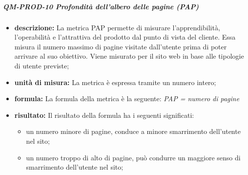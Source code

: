 			\subparagraph{QM-PROD-10 Profondità dell'albero delle pagine (PAP)}
			\begin{itemize}
      			\item \textbf{descrizione: }
					La metrica PAP permette di misurare l'apprendibilità, l'operabilità e l'attrattiva del prodotto dal punto di vista del cliente. Essa misura il numero massimo di pagine visitate dall'utente prima di poter arrivare al suo obiettivo.
					Viene misurato per il sito web in base alle tipologie di utente previste;
				\item \textbf{unità di misura: }
					La metrica è espressa tramite un numero intero;
				\item \textbf{formula: }
					La formula della metrica è la seguente:
					\textit{PAP = numero di pagine}
				\item \textbf{risultato: }
					Il risultato della formula ha i seguenti significati:
					\begin{itemize}
						\item un numero minore di pagine, conduce a minore smarrimento dell'utente nel sito; 
						\item un numero troppo di alto di pagine, può condurre un maggiore senso di smarrimento dell'utente nel sito;
					\end{itemize}
			\end{itemize}



